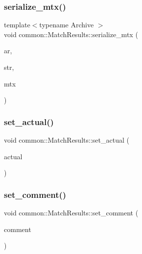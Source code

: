 \subsubsection{\texorpdfstring{serialize\+\_\+mtx()}{serialize\_mtx()}}
{\footnotesize\ttfamily template$<$typename Archive $>$ \\
void common\+::\+Match\+Results\+::serialize\+\_\+mtx (\begin{DoxyParamCaption}\item[{Archive \&}]{ar,  }\item[{std\+::string}]{str,  }\item[{Eigen\+::\+Matrix\+Xd \&}]{mtx }\end{DoxyParamCaption})\hspace{0.3cm}{\ttfamily [inline]}}

\mbox{\label{classcommon_1_1MatchResults_ab87b887370037de7ae611be2420071a8}} 
\subsubsection{\texorpdfstring{set\+\_\+actual()}{set\_actual()}}
{\footnotesize\ttfamily void common\+::\+Match\+Results\+::set\+\_\+actual (\begin{DoxyParamCaption}\item[{const std\+::vector$<$ double $>$ \&}]{actual }\end{DoxyParamCaption})\hspace{0.3cm}{\ttfamily [inline]}}

\mbox{\label{classcommon_1_1MatchResults_a2e4d287fb5ceb112d09cf564b334bb5b}} 
\subsubsection{\texorpdfstring{set\+\_\+comment()}{set\_comment()}}
{\footnotesize\ttfamily void common\+::\+Match\+Results\+::set\+\_\+comment (\begin{DoxyParamCaption}\item[{const std\+::string \&}]{comment }\end{DoxyParamCaption})\hspace{0.3cm}{\ttfamily [inline]}}

